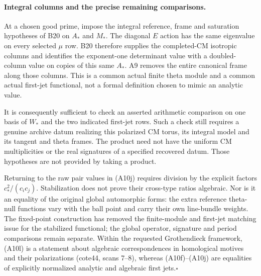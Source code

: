 \paragraph{Integral columns and the precise remaining comparisons.}
At a chosen good prime, impose the integral reference,
frame and saturation hypotheses of B20 on $A_*$ and $M_*$.
The diagonal $E$ action has the same eigenvalue on every
selected $\mu$ row.  B20 therefore supplies the completed-CM
isotropic columns and identifies the exponent-one determinant
value with a doubled-column value on copies of this same
$A_*$.  A9 removes the entire canonical frame along those
columns.  This is a common actual finite theta module and a
common actual first-jet functional, not a formal definition
chosen to mimic an analytic value.

It is consequently sufficient to check an asserted arithmetic
comparison on one basis of $W_*$ and the two indicated
first-jet rows.  Such a check still requires a genuine
archive datum realizing this polarized CM torus, its integral
model and its tangent and theta frames.  The product need
not have the uniform CM multiplicities or the real signatures
of a specified recovered datum.  Those hypotheses are not
provided by taking a product.

Returning to the raw pair values in (A10j) requires division
by the explicit factors $c_*^2/(c_ic_j)$.  Stabilization does
not prove their cross-type ratios algebraic.  Nor is it an
equality of the original global automorphic forms: the extra
reference theta-null functions vary with the ball point and
carry their own line-bundle weights.  The fixed-point
construction has removed the finite-module and first-jet
matching issue for the stabilized functional; the global
operator, signature and period comparisons remain separate.
Within the requested Grothendieck framework, (A10l) is a
statement about algebraic correspondences in homological
motives and their polarizations (cote44, scans 7--8), whereas
(A10f)--(A10j) are equalities of explicitly normalized
analytic and algebraic first jets.\hfill$\square$
